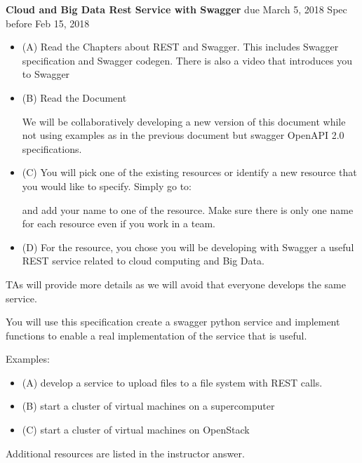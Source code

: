 \begin{exercise} {\bf Cloud and Big Data Rest Service with Swagger} due March 5, 2018 Spec before Feb 15, 2018

\begin{itemize}
     
   \item (A) Read the Chapters about REST and Swagger. This includes Swagger specification and Swagger codegen. There
         is also a video that introduces you to Swagger
 
   \item (B) Read the Document 
 
We will be collaboratively developing a new version of this document while not using examples as in the previous
document but swagger OpenAPI 2.0 specifications.
 
   \item (C) You will pick one of the existing resources or identify a
     new resource that you would like to specify. Simply go to:

and add your name to one of the resource. Make sure there is only one
name for each resource even if you work in a team.
 
   \item (D) For the resource, you chose you will be developing with
     Swagger a useful REST service related to cloud computing and Big
     Data.

 
 \end{itemize}
TAs will provide more details as we will avoid that everyone develops the same service. 
 
You will use this specification create a swagger python service and
implement functions to enable a real implementation of the service
that is useful.

 
Examples:

\begin{itemize}
\smallskip
\item (A) develop a service to upload files to a file system with REST calls.

\item (B) start a cluster of virtual machines on a supercomputer

\item (C) start a cluster of virtual machines on OpenStack

\end{itemize}


Additional resources are listed in the instructor answer. 
\end{exercise}

